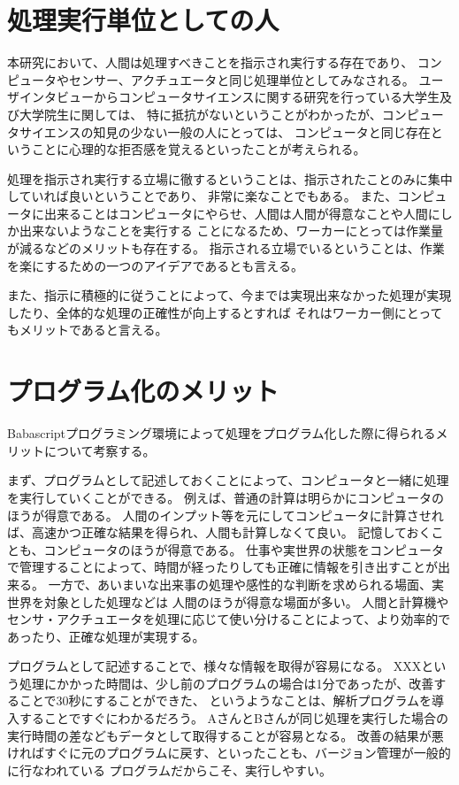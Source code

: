 \section{処理実行単位としての人}\label{ux51e6ux7406ux5b9fux884cux5358ux4f4dux3068ux3057ux3066ux306eux4eba}

本研究において、人間は処理すべきことを指示され実行する存在であり、
コンピュータやセンサー、アクチュエータと同じ処理単位としてみなされる。
ユーザインタビューからコンピュータサイエンスに関する研究を行っている大学生及び大学院生に関しては、
特に抵抗がないということがわかったが、コンピュータサイエンスの知見の少ない一般の人にとっては、
コンピュータと同じ存在ということに心理的な拒否感を覚えるといったことが考えられる。

処理を指示され実行する立場に徹するということは、指示されたことのみに集中していれば良いということであり、
非常に楽なことでもある。
また、コンピュータに出来ることはコンピュータにやらせ、人間は人間が得意なことや人間にしか出来ないようなことを実行する
ことになるため、ワーカーにとっては作業量が減るなどのメリットも存在する。
指示される立場でいるということは、作業を楽にするための一つのアイデアであるとも言える。

また、指示に積極的に従うことによって、今までは実現出来なかった処理が実現したり、全体的な処理の正確性が向上するとすれば
それはワーカー側にとってもメリットであると言える。

\section{プログラム化のメリット}\label{ux30d7ux30edux30b0ux30e9ux30e0ux5316ux306eux30e1ux30eaux30c3ux30c8}

Babascriptプログラミング環境によって処理をプログラム化した際に得られるメリットについて考察する。

まず、プログラムとして記述しておくことによって、コンピュータと一緒に処理を実行していくことができる。
例えば、普通の計算は明らかにコンピュータのほうが得意である。
人間のインプット等を元にしてコンピュータに計算させれば、高速かつ正確な結果を得られ、人間も計算しなくて良い。
記憶しておくことも、コンピュータのほうが得意である。
仕事や実世界の状態をコンピュータで管理することによって、時間が経ったりしても正確に情報を引き出すことが出来る。
一方で、あいまいな出来事の処理や感性的な判断を求められる場面、実世界を対象とした処理などは
人間のほうが得意な場面が多い。
人間と計算機やセンサ・アクチュエータを処理に応じて使い分けることによって、より効率的であったり、正確な処理が実現する。

プログラムとして記述することで、様々な情報を取得が容易になる。
XXXという処理にかかった時間は、少し前のプログラムの場合は1分であったが、改善することで30秒にすることができた、
というようなことは、解析プログラムを導入することですぐにわかるだろう。
AさんとBさんが同じ処理を実行した場合の実行時間の差などもデータとして取得することが容易となる。
改善の結果が悪ければすぐに元のプログラムに戻す、といったことも、バージョン管理が一般的に行なわれている
プログラムだからこそ、実行しやすい。

